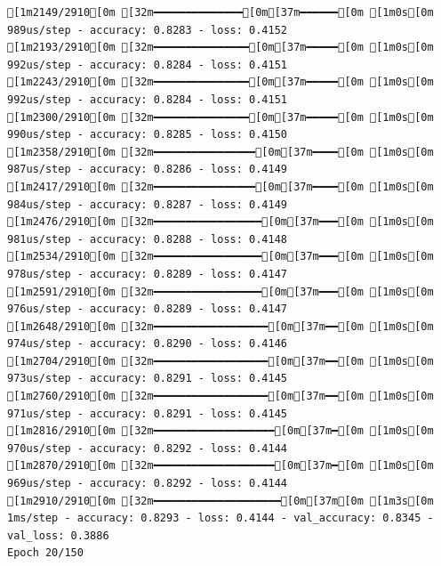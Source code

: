 \documentclass[
  letterpaper,
  DIV=11,
  numbers=noendperiod]{scrartcl}
\begin{document}
\begin{verbatim}
[1m2149/2910[0m [32m━━━━━━━━━━━━━━[0m[37m━━━━━━[0m [1m0s[0m 989us/step - accuracy: 0.8283 - loss: 0.4152
[1m2193/2910[0m [32m━━━━━━━━━━━━━━━[0m[37m━━━━━[0m [1m0s[0m 992us/step - accuracy: 0.8284 - loss: 0.4151
[1m2243/2910[0m [32m━━━━━━━━━━━━━━━[0m[37m━━━━━[0m [1m0s[0m 992us/step - accuracy: 0.8284 - loss: 0.4151
[1m2300/2910[0m [32m━━━━━━━━━━━━━━━[0m[37m━━━━━[0m [1m0s[0m 990us/step - accuracy: 0.8285 - loss: 0.4150
[1m2358/2910[0m [32m━━━━━━━━━━━━━━━━[0m[37m━━━━[0m [1m0s[0m 987us/step - accuracy: 0.8286 - loss: 0.4149
[1m2417/2910[0m [32m━━━━━━━━━━━━━━━━[0m[37m━━━━[0m [1m0s[0m 984us/step - accuracy: 0.8287 - loss: 0.4149
[1m2476/2910[0m [32m━━━━━━━━━━━━━━━━━[0m[37m━━━[0m [1m0s[0m 981us/step - accuracy: 0.8288 - loss: 0.4148
[1m2534/2910[0m [32m━━━━━━━━━━━━━━━━━[0m[37m━━━[0m [1m0s[0m 978us/step - accuracy: 0.8289 - loss: 0.4147
[1m2591/2910[0m [32m━━━━━━━━━━━━━━━━━[0m[37m━━━[0m [1m0s[0m 976us/step - accuracy: 0.8289 - loss: 0.4147
[1m2648/2910[0m [32m━━━━━━━━━━━━━━━━━━[0m[37m━━[0m [1m0s[0m 974us/step - accuracy: 0.8290 - loss: 0.4146
[1m2704/2910[0m [32m━━━━━━━━━━━━━━━━━━[0m[37m━━[0m [1m0s[0m 973us/step - accuracy: 0.8291 - loss: 0.4145
[1m2760/2910[0m [32m━━━━━━━━━━━━━━━━━━[0m[37m━━[0m [1m0s[0m 971us/step - accuracy: 0.8291 - loss: 0.4145
[1m2816/2910[0m [32m━━━━━━━━━━━━━━━━━━━[0m[37m━[0m [1m0s[0m 970us/step - accuracy: 0.8292 - loss: 0.4144
[1m2870/2910[0m [32m━━━━━━━━━━━━━━━━━━━[0m[37m━[0m [1m0s[0m 969us/step - accuracy: 0.8292 - loss: 0.4144
[1m2910/2910[0m [32m━━━━━━━━━━━━━━━━━━━━[0m[37m[0m [1m3s[0m 1ms/step - accuracy: 0.8293 - loss: 0.4144 - val_accuracy: 0.8345 - val_loss: 0.3886
Epoch 20/150


\end{verbatim}
\end{document}
